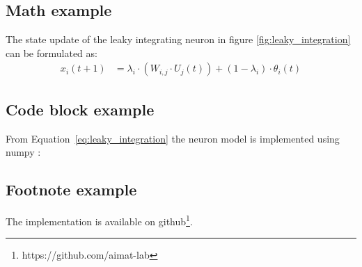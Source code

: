 \subsection{Math example}
The state update of the leaky integrating neuron in figure \ref{fig:leaky_integration} can be formulated as:
\begin{align}
    x_i(t+1) &= \lambda_i \cdot \left(W_{i,j} \cdot U_j(t)\right) + (1-\lambda_i) \cdot \theta_i(t)
    \label{eq:leaky_integration}
\end{align}


\subsection{Code block example}
From Equation~\ref{eq:leaky_integration} the neuron model is implemented using numpy \cite{harris:2020}:



\subsection{Footnote example}
The implementation is available on github\footnote{https://github.com/aimat-lab}.


